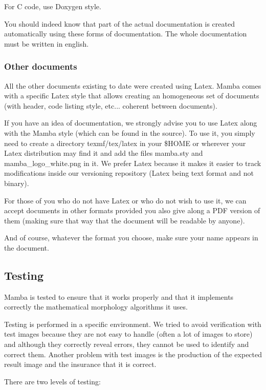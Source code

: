 \documentclass[a4paper,10pt,oneside]{article}
\begin{document}
For C code, use Doxygen style.

You should indeed know that part of the actual documentation is created
automatically using these forms of documentation. The whole documentation
must be written in english.

\subsubsection{Other documents}

All the other documents existing to date were created using Latex.
Mamba comes with a specific Latex style that allows creating an homogeneous
set of documents (with header, code listing style, etc... coherent
between documents).

If you have an idea of documentation, we strongly advise you to use
Latex along with the Mamba style (which can be found in the source).
To use it, you simply need to create a directory texmf/tex/latex in
your \$HOME or wherever your Latex distribution may find it and add
the files mamba.sty and mamba\_logo\_white.png in it. We prefer Latex
because it makes it easier to track modifications inside our versioning
repository (Latex being text format and not binary).

For those of you who do not have Latex or who do not wish to use it,
we can accept documents in other formats provided you also give along
a PDF version of them (making sure that way that the document will
be readable by anyone).

And of course, whatever the format you choose, make sure your name
appears in the document.

\subsection{Testing}

Mamba is tested to ensure that it works properly and that it
implements correctly the mathematical morphology algorithms it uses.

Testing is performed in a specific environment. We tried to avoid verification
with test images because they are not easy to handle (often a lot of images to
store) and although they correctly reveal errors, they cannot be used to
identify and correct them. Another problem with test images is the production
of the expected result image and the insurance that it is correct.

There are two levels of testing:
\end{document}
